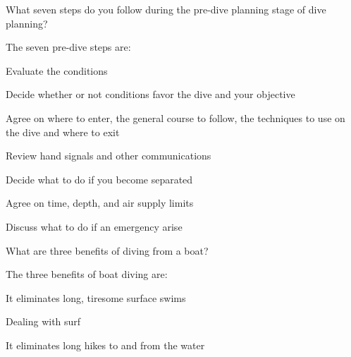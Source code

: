 	\begin{qanda}
		\begin{question}
What seven steps do you follow during the pre-dive planning stage of dive planning?
		\end{question}

		\begin{answer}
The seven pre-dive steps are:
			\begin{nospacenumberedlist}
				\item Evaluate the conditions
				\item Decide whether or not conditions favor the dive and your objective
				\item Agree on where to enter, the general course to follow, the techniques to use on the dive and where to exit
				\item Review hand signals and other communications
				\item Decide what to do if you become separated
				\item Agree on time, depth, and air supply limits
				\item Discuss what to do if an emergency arise
			\end{nospacenumberedlist}
		\end{answer}
	\end{qanda}

	\begin{qanda}
		\begin{question}
What are three benefits of diving from a boat?
		\end{question}

		\begin{answer}
The three benefits of boat diving are:
			\begin{nospacenumberedlist}
				\item It eliminates long, tiresome surface swims
				\item Dealing with surf
				\item It eliminates long hikes to and from the water
			\end{nospacenumberedlist}
		\end{answer}
	\end{qanda}


